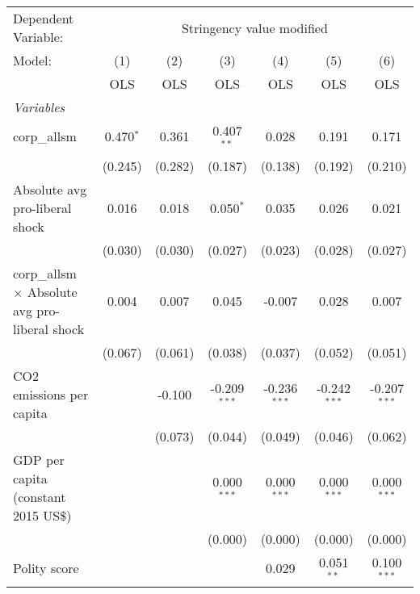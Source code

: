 
\begingroup
\centering
\begin{tabular}{lcccccc}
   \toprule
   Dependent Variable: & \multicolumn{6}{c}{Stringency value modified}\\
   Model:                                                & (1)         & (2)     & (3)            & (4)            & (5)            & (6)\\  
                                                         &  OLS        & OLS     & OLS            & OLS            & OLS            & OLS\\  
   \midrule
   \emph{Variables}\\
   corp\_allsm                                           & 0.470$^{*}$ & 0.361   & 0.407$^{**}$   & 0.028          & 0.191          & 0.171\\   
                                                         & (0.245)     & (0.282) & (0.187)        & (0.138)        & (0.192)        & (0.210)\\   
   Absolute avg pro-liberal shock                        & 0.016       & 0.018   & 0.050$^{*}$    & 0.035          & 0.026          & 0.021\\   
                                                         & (0.030)     & (0.030) & (0.027)        & (0.023)        & (0.028)        & (0.027)\\   
   corp\_allsm $\times$ Absolute avg pro-liberal shock   & 0.004       & 0.007   & 0.045          & -0.007         & 0.028          & 0.007\\   
                                                         & (0.067)     & (0.061) & (0.038)        & (0.037)        & (0.052)        & (0.051)\\   
   CO2 emissions per capita                              &             & -0.100  & -0.209$^{***}$ & -0.236$^{***}$ & -0.242$^{***}$ & -0.207$^{***}$\\   
                                                         &             & (0.073) & (0.044)        & (0.049)        & (0.046)        & (0.062)\\   
   GDP per capita (constant 2015 US\$)                   &             &         & 0.000$^{***}$  & 0.000$^{***}$  & 0.000$^{***}$  & 0.000$^{***}$\\   
                                                         &             &         & (0.000)        & (0.000)        & (0.000)        & (0.000)\\   
   Polity score                                          &             &         &                & 0.029          & 0.051$^{**}$   & 0.100$^{***}$\\   

\end{tabular}
